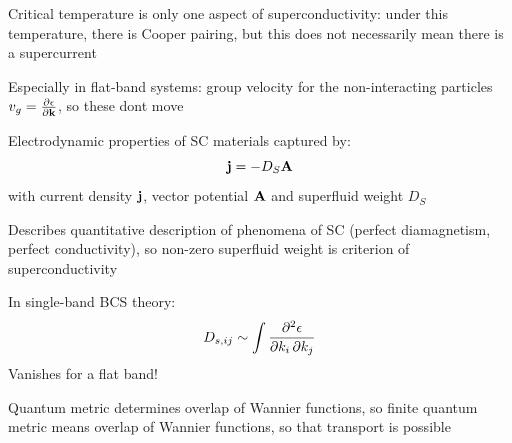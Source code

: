 \documentclass[aspectratio=169]{beamer}
\begin{document}
\begin{frame}
	
	Critical temperature is only one aspect of superconductivity: under this temperature, there is Cooper pairing, but this does not necessarily mean there is a supercurrent
	
	Especially in flat-band systems: group velocity for the non-interacting particles \(v_g = \pdv{\epsilon}{\mathbf{k}}\), so these dont move
\end{frame}

\begin{frame}
	
	Electrodynamic properties of SC materials captured by:
	\begin{equation}
		\mathbf{j} = -D_S \mathbf{A}
	\end{equation}
	with current density \(\mathbf{j}\), vector potential \(\mathbf{A}\) and superfluid weight \(D_S\)
	
	Describes quantitative description of phenomena of SC (perfect diamagnetism, perfect conductivity), so non-zero superfluid weight is criterion of superconductivity
	
	In single-band BCS theory:
	\begin{equation}
		D_{s, ij} \sim \int \pdv{\epsilon}{k_i,k_j}
	\end{equation}
	Vanishes for a flat band!
	
	
\end{frame}

\begin{frame}
	
	
	Quantum metric determines overlap of Wannier functions, so finite quantum metric means overlap of Wannier functions, so that transport is possible
\end{frame}
\end{document}

